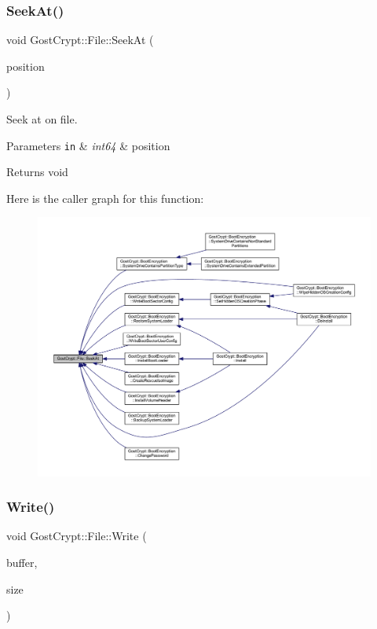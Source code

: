 \subsubsection{\texorpdfstring{Seek\+At()}{SeekAt()}}
{\footnotesize\ttfamily void Gost\+Crypt\+::\+File\+::\+Seek\+At (\begin{DoxyParamCaption}\item[{int64}]{position }\end{DoxyParamCaption})}



Seek at on file. 


\begin{DoxyParams}[1]{Parameters}
\mbox{\tt in}  & {\em int64} & position \\
\hline
\end{DoxyParams}
\begin{DoxyReturn}{Returns}
void 
\end{DoxyReturn}
Here is the caller graph for this function\+:
\nopagebreak
\begin{figure}[H]
\begin{center}
\leavevmode
\includegraphics[width=350pt]{class_gost_crypt_1_1_file_abfbb1c586ef29c31a905d1478d323bdd_icgraph}
\end{center}
\end{figure}
\mbox{\label{class_gost_crypt_1_1_file_a994d0e6bff285330edea0f5daaa17da1}} 
\subsubsection{\texorpdfstring{Write()}{Write()}}
{\footnotesize\ttfamily void Gost\+Crypt\+::\+File\+::\+Write (\begin{DoxyParamCaption}\item[{byte $\ast$}]{buffer,  }\item[{D\+W\+O\+RD}]{size }\end{DoxyParamCaption})}



